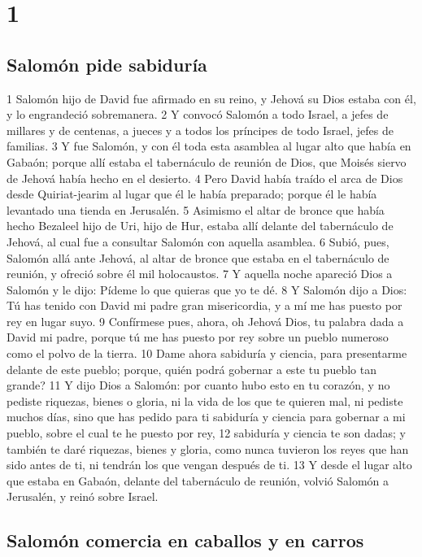 
\chapter{1}

\section*{Salomón pide sabiduría}

1 Salomón hijo de David fue afirmado en su reino, y Jehová su Dios estaba con él, y lo engrandeció sobremanera.
2 Y convocó Salomón a todo Israel, a jefes de millares y de centenas, a jueces y a todos los príncipes de todo Israel, jefes de familias.
3  Y fue Salomón, y con él toda esta asamblea al lugar alto que había en Gabaón; porque allí estaba el tabernáculo de reunión de Dios, que Moisés siervo de Jehová había hecho en el desierto.
4 Pero David había traído el arca de Dios desde Quiriat-jearim al lugar que él le había preparado;  porque él le había levantado una tienda en Jerusalén. 
 5 Asimismo el altar de bronce que había hecho Bezaleel hijo de Uri, hijo de Hur, estaba allí delante del tabernáculo de Jehová, al cual fue a consultar Salomón con aquella asamblea. 
6 Subió, pues, Salomón allá ante Jehová, al altar de bronce que estaba en el tabernáculo de reunión, y ofreció sobre él mil holocaustos.
7 Y aquella noche apareció Dios  a Salomón y le dijo: Pídeme lo que quieras que yo te dé.
8 Y Salomón dijo a Dios: Tú has tenido con David mi padre gran misericordia, y a mí me has puesto por rey en  lugar suyo.
9 Confírmese pues, ahora, oh Jehová Dios,  tu palabra dada a David mi padre, porque tú me has puesto por rey sobre un pueblo numeroso como el polvo de la tierra. 
10 Dame ahora sabiduría y ciencia, para presentarme delante de este pueblo; porque, quién podrá gobernar a este tu pueblo tan grande?
11 Y dijo Dios a Salomón: por cuanto hubo esto en tu corazón, y no pediste riquezas, bienes o gloria, ni la vida de los que te quieren mal, ni pediste muchos días, sino que has pedido para ti sabiduría y ciencia para gobernar a mi pueblo, sobre el cual te he puesto por rey,
12 sabiduría y ciencia te son dadas; y también te daré riquezas, bienes y gloria, como nunca tuvieron los reyes que han sido antes de ti, ni tendrán los que vengan después de ti.
13 Y desde el lugar alto que estaba en Gabaón, delante del tabernáculo de reunión, volvió Salomón a Jerusalén, y reinó sobre Israel.
\section*{Salomón comercia en caballos y en carros}

